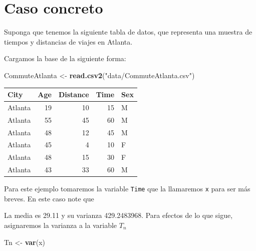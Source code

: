 \documentclass[
  12pt,
]{book}
\newenvironment{Shaded}{\begin{snugshade}}{\end{snugshade}}
\newcommand{\KeywordTok}[1]{\textcolor[rgb]{0.13,0.29,0.53}{\textbf{#1}}}
\newcommand{\NormalTok}[1]{#1}
\newcommand{\OperatorTok}[1]{\textcolor[rgb]{0.81,0.36,0.00}{\textbf{#1}}}
\newcommand{\StringTok}[1]{\textcolor[rgb]{0.31,0.60,0.02}{#1}}
\theoremstyle{definition}
\theoremstyle{definition}
\theoremstyle{definition}
\theoremstyle{remark}
\begin{document}
\hypertarget{caso-concreto}{%
\section{Caso concreto}\label{caso-concreto}}

Suponga que tenemos la siguiente tabla de datos, que representa una
muestra de tiempos y distancias de viajes en Atlanta.

Cargamos la base de la siguiente forma:

\begin{Shaded}
\begin{Highlighting}[]
\NormalTok{CommuteAtlanta <-}\StringTok{ }\KeywordTok{read.csv2}\NormalTok{(}\StringTok{"data/CommuteAtlanta.csv"}\NormalTok{)}
\end{Highlighting}
\end{Shaded}

\begin{tabular}{l|r|r|r|l}
\hline
City & Age & Distance & Time & Sex\\
\hline
Atlanta & 19 & 10 & 15 & M\\
\hline
Atlanta & 55 & 45 & 60 & M\\
\hline
Atlanta & 48 & 12 & 45 & M\\
\hline
Atlanta & 45 & 4 & 10 & F\\
\hline
Atlanta & 48 & 15 & 30 & F\\
\hline
Atlanta & 43 & 33 & 60 & M\\
\hline
\end{tabular}

Para este ejemplo tomaremos la variable \texttt{Time} que la
llamaremos \texttt{x} para ser más breves. En este caso note que

\begin{Shaded}
\end{Shaded}

La media es 29.11 y su varianza 429.2483968. Para efectos de lo que sigue, asignaremos la varianza a la variable \(T_n\)

\begin{Shaded}
\begin{Highlighting}[]
\NormalTok{Tn <-}\StringTok{ }\KeywordTok{var}\NormalTok{(x)}
\end{Highlighting}
\end{Shaded}
\end{document}
